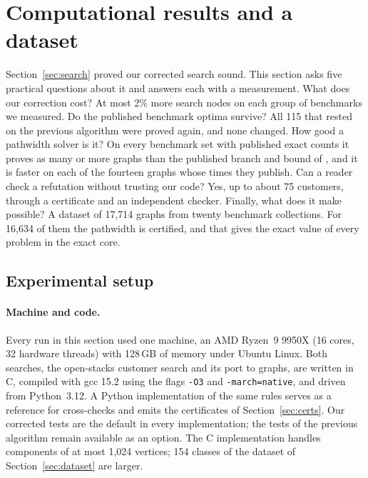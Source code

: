 \section{Computational results and a dataset}
\label{sec:results}

Section~\ref{sec:search} proved our corrected search sound. This section asks
five practical questions about it and answers each with a measurement. What
does our correction cost? At most 2\% more search nodes on each group of benchmarks we measured. Do the published
benchmark optima survive? All 115 that rested on the previous algorithm
\citep{ChuStuckey2009} were proved again, and none changed. How good a
pathwidth solver is it? On every benchmark set with published exact counts it proves as many or more graphs than the published branch and bound of \citet{CoudertMazauricNisse2016}, and it is faster on each of the fourteen graphs whose times they publish. Can a reader check a refutation without
trusting our code? Yes, up to about 75 customers, through a certificate and an
independent checker. Finally, what does it make possible? A dataset of 17,714
graphs from twenty benchmark collections. For 16,634 of them the pathwidth is
certified, and that gives the exact value of every problem in the exact core.

\subsection{Experimental setup}
\label{sec:setup}

\paragraph{Machine and code.} Every run in this section used one
machine, an AMD Ryzen~9 9950X (16 cores, 32 hardware threads) with 128\,GB of
memory under Ubuntu Linux. Both searches, the open-stacks customer search and
its port to graphs, are written in C, compiled with gcc 15.2 using the
flags \texttt{-O3} and \texttt{-march=native}, and driven from Python~3.12. A Python implementation of the
same rules serves as a reference for cross-checks and emits the certificates
of Section~\ref{sec:certs}. Our corrected tests are the default in every
implementation; the tests of the previous algorithm remain available as an option. The C
implementation handles components of at most 1,024 vertices; 154 classes of
the dataset of Section~\ref{sec:dataset} are larger.

